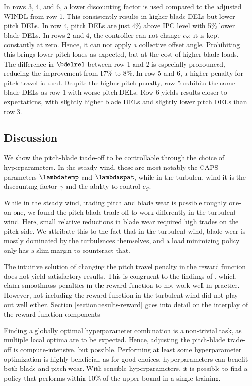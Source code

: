 In rows 3, 4, and 6, a lower discounting factor is used compared to the adjusted WINDL from row 1. This consistently results in higher blade DELs but lower pitch DELs. In row 4, pitch DELs are just 4\% above IPC level with 5\% lower blade DELs. In rows 2 and 4, the controller can not change $c_S$; it is kept constantly at zero. Hence, it can not apply a collective offset angle. Prohibiting this brings lower pitch loads as expected, but at the cost of higher blade loads. The difference in $\bdelrel$ between row 1 and 2 is especially pronounced, reducing the improvement from 17\% to 8\%. In row 5 and 6, a higher penalty for pitch travel is used. Despite the higher pitch penalty, row 5 exhibits the same blade DELs as row 1 with worse pitch DELs. Row 6 yields results closer to expectations, with slightly higher blade DELs and slightly lower pitch DELs than row 3.


\subsection{Discussion}

We show the pitch-blade trade-off to be controllable through the choice of hyperparameters. In the steady wind, these are most notably the \ac{CAPS} parameters $\lambdatemp$ and $\lambdaspat$, while in the turbulent wind it is the discounting factor $\gamma$ and the ability to control $c_S$.

While in the steady wind, trading pitch and blade wear is possible roughly one-on-one, we found the pitch blade trade-off to work differently in the turbulent wind. Here, small relative reductions in blade wear required high trades on the pitch side. We attribute this to the fact that in the turbulent wind, blade wear is mostly dominated by the turbulences themselves, and a load minimizing policy only has a slim margin to counteract that.

The intuitive solution of changing the pitch travel penalty in the reward function does not yield satisfactory results. This is congruent to the findings of \citet{mysoreRegularizingActionPolicies2021}, which claim smoothness penalties in the reward function to not work well in practice. However, not including the reward function in the turbulent wind did not play out well either. Section \ref{section:results-reward} goes into detail on the interplay of the reward function components.

Finding a globally optimal hyperparameter combination is a non-trivial task, as multiple local optima are to be expected. Hence, adjusting the pitch-blade trade-off is compute-intensive, but possible. Performing at least some hyperparameter optimization is highly beneficial, as for good choices, hyperparameters can benefit both blade and pitch wear. With sensible hyperparameters, it is possible to find a policy that performs within 10\% of the upper bound in a single training. 

